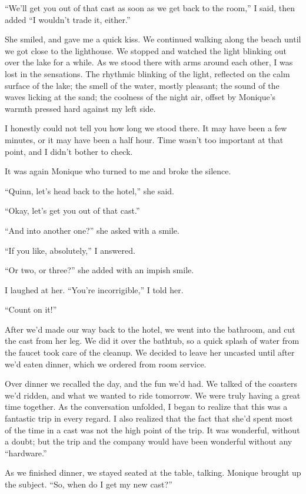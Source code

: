 ``We'll get you out of that cast as soon as we get back to the room,'' I said, then added ``I
wouldn't trade it, either.''

She smiled, and gave me a quick kiss. We continued walking along the beach until we got
close to the lighthouse. We stopped and watched the light blinking out over the lake for a
while. As we stood there with arms around each other, I was lost in the sensations. The rhythmic
blinking of the light, reflected on the calm surface of the lake; the smell of the water, mostly
pleasant; the sound of the waves licking at the sand; the coolness of the night air, offset by
Monique's warmth pressed hard against my left side.

I honestly could not tell you how long we stood there. It may have been a few minutes, or it
may have been a half hour. Time wasn't too important at that point, and I didn't bother to
check.

It was again Monique who turned to me and broke the silence.

``Quinn, let's head back to the hotel,'' she said.

``Okay, let's get you out of that cast.''

``And into another one?'' she asked with a smile.

``If you like, absolutely,'' I answered.

``Or two, or three?'' she added with an impish smile.

I laughed at her. ``You're incorrigible,'' I told her.

``Count on it!''

After we'd made our way back to the hotel, we went into the bathroom, and cut the cast from
her leg. We did it over the bathtub, so a quick splash of water from the faucet took care of the
cleanup. We decided to leave her uncasted until after we'd eaten dinner, which we ordered from
room service.

Over dinner we recalled the day, and the fun we'd had. We talked of the coasters we'd
ridden, and what we wanted to ride tomorrow. We were truly having a great time together. As the
conversation unfolded, I began to realize that this was a fantastic trip in every regard. I also
realized that the fact that she'd spent most of the time in a cast was not the high point of the
trip. It was wonderful, without a doubt; but the trip and the company would have been wonderful
without any ``hardware.''

As we finished dinner, we stayed seated at the table, talking. Monique brought up the
subject. ``So, when do I get my new cast?''

